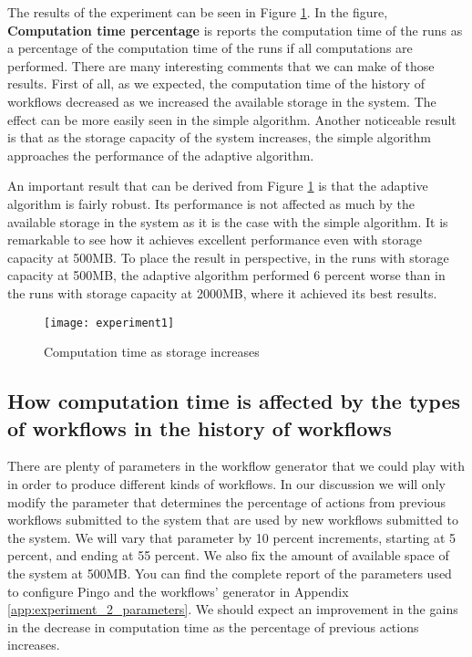 The results of the experiment can be seen in Figure \ref{fig:experiment1}.  In the figure, \textbf{Computation time percentage} is reports the computation time of the runs as a percentage of the computation time of the runs if all computations are performed. There are many interesting comments that we can make of those results. First of all, as we expected, the computation time of the history of workflows decreased as we increased the available storage in the system.  The effect can be more easily seen in the simple algorithm.  Another noticeable result is that as the storage capacity of the system increases, the simple algorithm approaches the performance of the adaptive algorithm.

An important result that can be derived from Figure \ref{fig:experiment1} is that the adaptive algorithm is fairly robust. Its performance is not affected as much by the available storage in the system as it is the case with the simple algorithm. It is remarkable to see how it achieves excellent performance even with storage capacity at 500MB.  To place the result in perspective, in the runs with storage capacity at 500MB, the adaptive algorithm performed 6 percent worse than in the runs with storage capacity at 2000MB, where it achieved its best results.


\begin{figure}
\centering
\texttt{[image: experiment1]}
\caption{Computation time as storage increases}
\label{fig:experiment1}
\end{figure}


\subsection{How computation time is affected by the types of workflows in the history of workflows}
There are plenty of parameters in the workflow generator that we could play with in order to produce different kinds of workflows.  In our discussion we will only modify the parameter that determines the percentage of actions from previous workflows submitted to the system that are used by new workflows submitted to the system.  We will vary that parameter by 10 percent increments, starting at 5 percent, and ending at 55 percent.  We also fix the amount of available space of the system at 500MB.  You can find the complete report of the parameters used to configure Pingo and the workflows' generator in Appendix \ref{app:experiment_2_parameters}. We should expect an improvement in the gains in the decrease in computation time as the percentage of previous actions increases.

